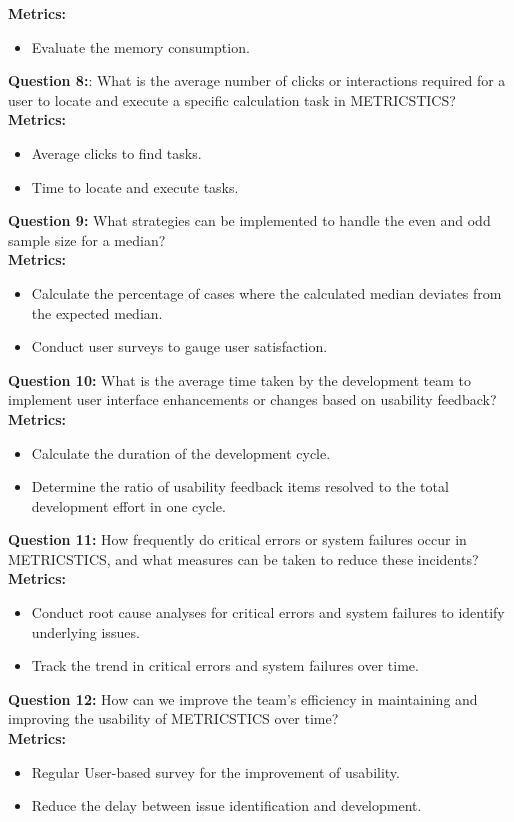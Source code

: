 \textbf{Metrics:}
\begin{itemize}
    \item  Evaluate the memory consumption. 
\end{itemize}
\vspace{10pt}
\textbf{Question 8:}: What is the average number of clicks or interactions required for a user to locate and execute a specific calculation task in METRICSTICS? \\

\textbf{Metrics:}
\begin{itemize}
    \item Average clicks to find tasks.
    \item Time to locate and execute tasks.
\end{itemize}
\vspace{10pt}
\textbf{Question 9:} What strategies can be implemented to handle the even and odd sample size for a median? \\

\textbf{Metrics:}
\begin{itemize}
    \item Calculate the percentage of cases where the calculated median deviates from the expected median.
    \item Conduct user surveys to gauge user satisfaction.
\end{itemize}
\vspace{10pt}
\textbf{Question 10:} What is the average time taken by the development team to implement user interface enhancements or changes based on usability feedback? \\

\textbf{Metrics:}
\begin{itemize}
    \item Calculate the duration of the development cycle.
    \item Determine the ratio of usability feedback items resolved to the total development effort in one cycle.
\\
\end{itemize}
\vspace{10pt}
\textbf{Question 11:} How frequently do critical errors or system failures occur in METRICSTICS, and what measures can be taken to reduce these incidents?  \\

\textbf{Metrics:}
\begin{itemize}
    \item Conduct root cause analyses for critical errors and system failures to identify underlying issues.
    \item Track the trend in critical errors and system failures over time.
 \\
\end{itemize}
\vspace{10pt}
\textbf{Question 12:} How can we improve the team’s efficiency in maintaining and improving the usability of METRICSTICS over time? \\

\textbf{Metrics:}
\begin{itemize}
    \item Regular User-based survey for the improvement of usability.
    \item Reduce the delay between issue identification and development. \\
\vspace{10pt}
\vspace{100pt}
\end{itemize}


